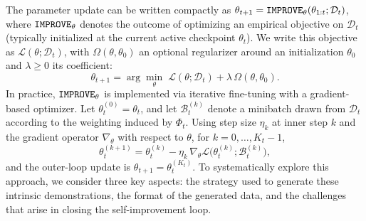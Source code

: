 The parameter update can be written compactly as $\theta_{t+1}=\operatorname{\mathtt{IMPROVE}}_{\theta}(\theta_{1:t};\mathcal{D}_t)$, where $\operatorname{\mathtt{IMPROVE}}_{\theta}$ denotes the outcome of optimizing an empirical objective on $\mathcal{D}_t$ (typically initialized at the current active checkpoint $\theta_t$). We write this objective as $\mathcal{L}(\theta;\mathcal{D}_t)$, with $\Omega(\theta,\theta_0)$ an optional regularizer around an initialization $\theta_0$ and $\lambda\ge 0$ its coefficient:
\begin{equation}
\theta_{t+1}=\arg\min_{\theta}\;\mathcal{L}(\theta;\mathcal{D}_t)+\lambda\,\Omega(\theta,\theta_0).
\end{equation}
In practice, $\operatorname{\mathtt{IMPROVE}}_{\theta}$ is implemented via iterative fine-tuning with a gradient-based optimizer. Let $\theta_t^{(0)}=\theta_t$, and let $\mathcal{B}_t^{(k)}$ denote a minibatch drawn from $\mathcal{D}_t$ according to the weighting induced by $\Phi_t$. Using step size $\eta_k$ at inner step $k$ and the gradient operator $\nabla_{\theta}$ with respect to $\theta$, for $k=0,\dots,K_t-1$,
\begin{equation}
\theta_t^{(k+1)}=\theta_t^{(k)}-\eta_k\,\nabla_{\theta}\mathcal{L}\big(\theta_t^{(k)};\mathcal{B}_t^{(k)}\big),
\end{equation}
and the outer-loop update is $\theta_{t+1}=\theta_t^{(K_t)}$. To systematically explore this approach, we consider three key aspects: the strategy used to generate these intrinsic demonstrations, the format of the generated data, and the challenges that arise in closing the self-improvement loop.



